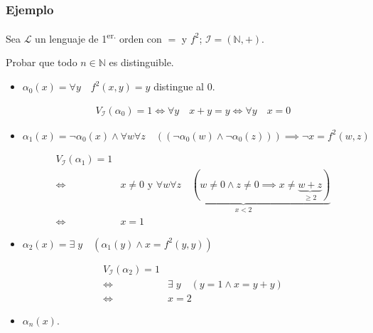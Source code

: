     \subsubsection{Ejemplo}

    Sea $\mathcal{L}$ un lenguaje de 1\textsuperscript{er.} orden con $=$ y $f^2$;
    $\mathcal{I} = (\mathbb{N}, +)$.

    Probar que todo $n \in \mathbb{N}$ es distinguible.

    \begin{itemize}
        \item $\alpha_0(x) = \forall y \quad f^2(x,y) = y$ distingue al $0$.

            \begin{gather*}
                V_{\mathcal{I}}(\alpha_0) = 1
                \iff \forall y \quad x + y = y 
                \iff \forall y \quad x = 0
            \end{gather*}

        \item $\alpha_1(x) = \neg \alpha_0(x) \wedge 
            \forall w \forall z \quad ((\neg \alpha_0(w) \wedge \neg \alpha_0(z))) 
            \implies \neg x = f^2(w,z)$

        \begin{align*}
            V_{\mathcal{I}}(\alpha_1) = 1 \\
            \iff & x \neq 0 \text{ y }
            \underbrace{\forall w \forall z \quad (w \neq 0 \wedge z \neq 0
            \implies x \neq \underbrace{w + z}_{\geq 2})}_{x < 2} \\
            \iff & x = 1
        \end{align*}

    \item $\alpha_2(x) = \exists \; y \quad (\alpha_1(y) \wedge x = f^2(y,y))$

        \begin{align*}
            V_{\mathcal{I}}(\alpha_2) = 1 \\
            \iff & \exists \; y \quad (y=1 \wedge x = y+y) \\
            \iff & x = 2
        \end{align*}

    \item $\alpha_n(x)$.


\end{itemize}
